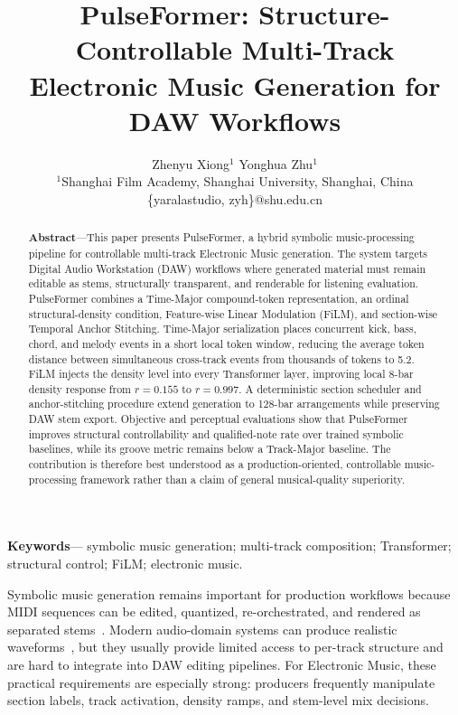 \documentclass[11pt,twocolumn,a4paper]{article}
\title{\vspace{-7mm}\Large\bfseries PulseFormer: Structure-Controllable Multi-Track Electronic Music Generation for DAW Workflows}
\author{Zhenyu Xiong$^{1}$ \quad Yonghua Zhu$^{1}$\\
\small $^{1}$Shanghai Film Academy, Shanghai University, Shanghai, China\\
\small \{yaralastudio, zyh\}@shu.edu.cn}
\date{}
\makeatletter
\renewcommand\section{\@startsection{section}{1}{0pt}{1.0ex plus .2ex}{0.6ex}{\centering\normalfont\bfseries}}
\makeatother
\begin{document}
\maketitle
\vspace{-7mm}

\begin{abstract}
\noindent\textbf{Abstract}---This paper presents PulseFormer, a hybrid symbolic music-processing pipeline for controllable multi-track Electronic Music generation. The system targets Digital Audio Workstation (DAW) workflows where generated material must remain editable as stems, structurally transparent, and renderable for listening evaluation. PulseFormer combines a Time-Major compound-token representation, an ordinal structural-density condition, Feature-wise Linear Modulation (FiLM), and section-wise Temporal Anchor Stitching. Time-Major serialization places concurrent kick, bass, chord, and melody events in a short local token window, reducing the average token distance between simultaneous cross-track events from thousands of tokens to 5.2. FiLM injects the density level into every Transformer layer, improving local 8-bar density response from $r=0.155$ to $r=0.997$. A deterministic section scheduler and anchor-stitching procedure extend generation to 128-bar arrangements while preserving DAW stem export. Objective and perceptual evaluations show that PulseFormer improves structural controllability and qualified-note rate over trained symbolic baselines, while its groove metric remains below a Track-Major baseline. The contribution is therefore best understood as a production-oriented, controllable music-processing framework rather than a claim of general musical-quality superiority.
\end{abstract}
\vspace{-2mm}
\noindent\textbf{Keywords}--- symbolic music generation; multi-track composition; Transformer; structural control; FiLM; electronic music.

\section{Introduction}
Symbolic music generation remains important for production workflows because MIDI sequences can be edited, quantized, re-orchestrated, and rendered as separated stems~\cite{huang2019music,dong2020muspy}. Modern audio-domain systems can produce realistic waveforms~\cite{dhariwal2020jukebox,copet2023simple,agostinelli2023musiclm}, but they usually provide limited access to per-track structure and are hard to integrate into DAW editing pipelines. For Electronic Music, these practical requirements are especially strong: producers frequently manipulate section labels, track activation, density ramps, and stem-level mix decisions.
\end{document}
